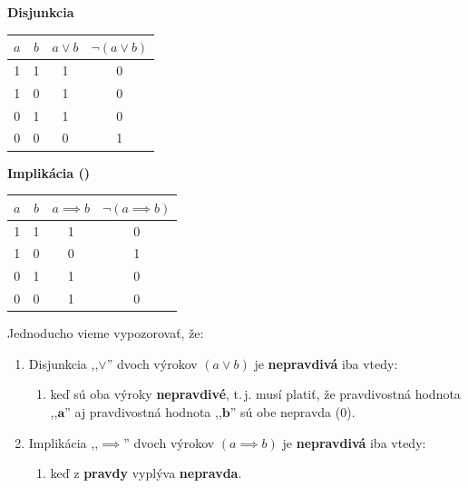 \documentclass{article}
\begin{document}
\begin{center}
\begin{minipage}[c]{0.45\textwidth}
\centering
\textbf{Disjunkcia} \\[2mm]
\begin{tabular}{|c|c|c|c|}
\hline
$a$ & $b$ & $a \lor b$ & $\neg(a \lor b)$ \\ \hline
1 & 1 & 1 & 0 \\ \hline
1 & 0 & 1 & 0 \\ \hline
0 & 1 & 1 & 0 \\ \hline
0 & 0 & 0 & 1 \\ \hline
\end{tabular}
\end{minipage}%
\hspace{0.03\textwidth}%
\begin{minipage}[c]{0.45\textwidth}
\centering
\textbf{Implikácia (\ast)} \\[2mm]
\begin{tabular}{|c|c|c|c|}
\hline
$a$ & $b$ & $a \implies b$ & $\neg(a \implies b)$ \\ \hline
1 & 1 & 1 & 0 \\ \hline
1 & 0 & 0 & 1 \\ \hline
0 & 1 & 1 & 0 \\ \hline
0 & 0 & 1 & 0 \\ \hline
\end{tabular}
\end{minipage}
\end{center}
\vspace{10mm}
Jednoducho vieme vypozorovať, že:
\begin{enumerate}
    \item Disjunkcia ,,$\lor$'' dvoch výrokov $(a \lor b)$ je \textbf{nepravdivá} iba vtedy:
    \begin{enumerate}[label=\alph*)]
        \item keď sú oba výroky \textbf{nepravdivé}, t.\,j. musí platiť, že pravdivostná hodnota ,,$\textbf{a}$'' aj pravdivostná hodnota ,,$\textbf{b}$'' sú obe nepravda (0).  
    \end{enumerate}
    \vspace{5mm}
    \item Implikácia ,,$\implies$'' dvoch výrokov $(a \implies b)$ je \textbf{nepravdivá} iba vtedy:  
    \begin{enumerate}[label=\alph*)]
        \item keď z \textbf{pravdy} vyplýva \textbf{nepravda}.
    \end{enumerate}
\end{enumerate}
\newpage
\end{document}
